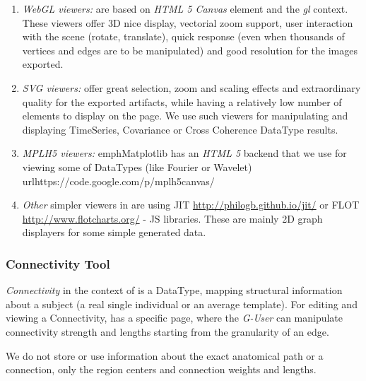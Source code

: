   \begin{enumerate}
    \item \emph{WebGL viewers:} are based on \emph{HTML 5 Canvas} element
    and the \emph{gl} context. These viewers offer 3D nice display,
    vectorial zoom support, user interaction with the scene (rotate,
    translate), quick response (even when thousands of vertices and edges
    are to be manipulated) and good resolution for the images exported.
    
    \item \emph{SVG viewers:} offer great selection, zoom and scaling
    effects and extraordinary quality for the exported artifacts, while
    having a relatively low number of elements to display on the page. We
    use such viewers for manipulating and displaying TimeSeries,
    Covariance or Cross Coherence DataType results.

    \item \emph{MPLH5 viewers:}  emph{Matplotlib} has an \emph{HTML 5}
    backend that we use for viewing some of \TVB DataTypes (like
    Fourier or Wavelet) url{https://code.google.com/p/mplh5canvas/}

    \item \emph{Other} simpler viewers in \TVB are using JIT
    \url{http://philogb.github.io/jit/} or FLOT
    \url{http://www.flotcharts.org/} - JS libraries. These are mainly
    2D graph displayers for some simple \TVB generated data.
  \end{enumerate}


\subsubsection{Connectivity Tool}

    \emph{Connectivity} in the context of \TVB is a DataType, mapping structural
    information about a subject (a real single individual or an average template). For
    editing and viewing a Connectivity, \TVB has a specific page, where
    the \emph{G-User} can manipulate connectivity strength and lengths
    starting from the granularity of an edge.

    We do not store or use information about the exact anatomical path or
    a connection, only the region centers and connection weights and
    lengths.


